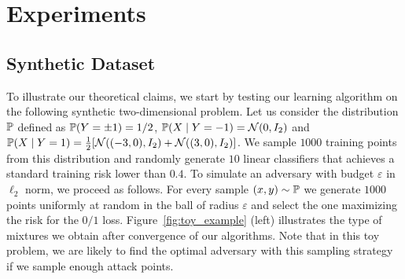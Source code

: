 
\section{Experiments}

\subsection{Synthetic Dataset}


To illustrate our theoretical claims, we start by testing our learning algorithm on the following synthetic two-dimensional problem. Let us consider the distribution $\mathbb{P}$ defined as  $\PP\left(Y =\pm 1\right)=1/2$, $\PP\left(X\mid Y=-1\right) = \mathcal{N}(0,I_2)$ and $\PP\left(X \mid Y=1\right) = \frac12\left[\mathcal{N}((-3,0),I_2)+\mathcal{N}((3,0),I_2) \right]$.
We sample $1000$ training points from this distribution and randomly generate $10$ linear classifiers that achieves a standard training risk lower than $0.4$. To simulate an adversary with budget $\varepsilon$ in $\ell_2$ norm, we proceed as follows. For every sample $(x,y)\sim \mathbb{P}$ we generate $1000$ points uniformly at random in the ball of radius $\varepsilon$ and select the one maximizing the risk for the $0/1$ loss. Figure~\ref{fig:toy_example} (left) illustrates the type of mixtures we obtain after convergence of our algorithms. Note that in this toy problem, we are likely to find the optimal adversary with this sampling strategy if we sample enough attack points. 
